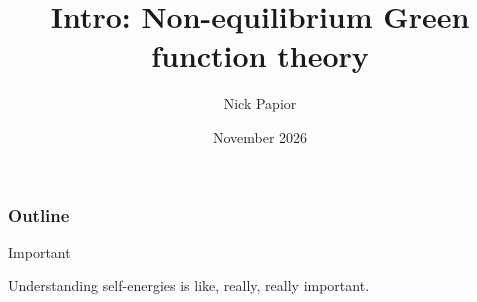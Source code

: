 

\graphicspath{{fig/}{../fig/}{../01/fig/}}
\usepackage[export]{adjustbox}


\date{November 2026}
\title{Intro: Non-equilibrium Green function theory}
\author{Nick Papior}




\begin{frame}
  \titlepage
\end{frame}

\begin{frame}
  \frametitle{Outline}
  \tableofcontents
\end{frame}

\showbondcurrentfalse
\showdensitymatrixweighingfalse
\showintromotivationfalse
\showintrotbtnterminalfalse
\shownegftransmissionfalse


\begin{frame}

  \vfill

  \centering
  \begin{minipage}{.7\linewidth}

  \begin{block}{Important}

    Understanding self-energies is like, really, really important.

  \end{block}

  \end{minipage}

  \vfill
\end{frame}




